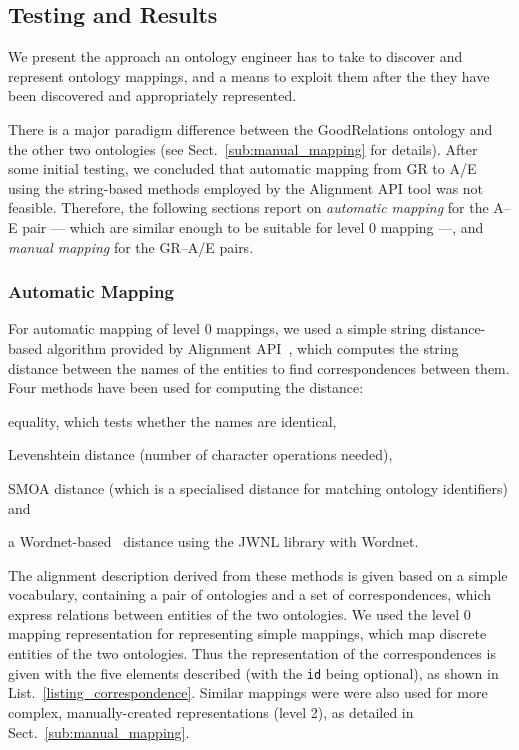 \subsection{Testing and Results}
\label{testing}

We present the approach an ontology engineer has to take to discover and represent ontology mappings, and a means to exploit them after the they have been discovered and appropriately represented.

There is a major paradigm difference between the GoodRelations ontology and the other two ontologies (see Sect.~\ref{sub:manual_mapping} for details). After some initial testing, we concluded that automatic mapping from GR to A/E using the string-based methods employed by the Alignment API tool was not feasible. Therefore, the following sections report on \emph{automatic mapping} for the A--E pair --- which are similar enough to be suitable for level 0 mapping ---, and \emph{manual mapping} for the GR--A/E pairs.

\subsubsection{Automatic Mapping}


For automatic mapping of level 0 mappings, we used a simple string distance-based algorithm provided by Alignment API~\cite{euzenat2004api}, which computes the string distance between the names of the entities to find correspondences between them. Four methods have been used for computing the distance:
\begin{inparaenum}[(1)]
    \item equality, which tests whether the names are identical, 
    \item Levenshtein distance (number of character operations needed), 
    \item SMOA distance (which is a specialised distance for matching ontology identifiers) and
    \item a Wordnet-based~\cite{fellbaum1998wordnet} distance using the JWNL library with Wordnet.
\end{inparaenum}

The alignment description derived from these methods is given based on a simple vocabulary, containing a pair of ontologies and a set of correspondences, which express relations between entities of the two ontologies.
We used the level 0 mapping representation for representing simple mappings, which map discrete entities of the two ontologies. Thus the representation of the correspondences is given with the five elements described (with the \texttt{id} being optional), as shown in List.~\ref{listing_correspondence}. Similar mappings were were also used for more complex, manually-created representations (level 2), as detailed in Sect.~\ref{sub:manual_mapping}.

